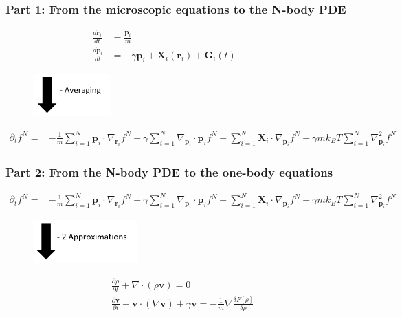 \documentclass[aspectratio=169,xcolor=dvipsnames]{beamer}
\begin{document}
\begin{frame}
	\frametitle{Part 1: From the microscopic equations to the N-body PDE}
	
	\begin{align*}
	\frac{d \mathbf{r}_i}{dt} &= \frac{\mathbf{p}_i}{m}\\
	\frac{d \mathbf{p}_i}{dt} &= - \gamma \mathbf{p}_i + \mathbf{X}_i(\mathbf{r}_i) + \mathbf{G}_i(t) \qquad \quad
	\end{align*}
	\vspace{-0.5cm}
	\begin{figure}
		\includegraphics[width=3cm]{Arrow2.png}
	\end{figure}
	\vspace{-0.3cm}
	\begin{align*}
	\partial_t f^N = &- \frac{1}{m} \sum_{i=1}^N \mathbf{p}_i \cdot \nabla_{\mathbf{r}_i} f^N + \gamma \sum_{i = 1}^N \nabla_{\mathbf{p}_i}
	\cdot \mathbf{p}_i f^N - \sum_{i=1}^N \mathbf{X}_i \cdot \nabla_{\mathbf{p}_i}f^N + \gamma m k_BT \sum_{i=1}^N \nabla^2_{\mathbf{p}_i}f^N	
	\end{align*}

\end{frame}
\begin{frame}
	\frametitle{Part 2: From the N-body PDE to the one-body equations}
	\begin{align*}
	\partial_t f^N = &- \frac{1}{m} \sum_{i=1}^N \mathbf{p}_i \cdot \nabla_{\mathbf{r}_i} f^N + \gamma \sum_{i = 1}^N \nabla_{\mathbf{p}_i}
	\cdot \mathbf{p}_i f^N - \sum_{i=1}^N \mathbf{X}_i \cdot \nabla_{\mathbf{p}_i}f^N + \gamma m k_BT \sum_{i=1}^N \nabla^2_{\mathbf{p}_i}f^N	
	\end{align*}
	\vspace{-0.2cm}
	\begin{figure}
		\includegraphics[width=4cm]{Arrow3.png}
	\end{figure}
	\vspace{-0.3cm}
	\begin{align*}
	&\frac{\partial \rho}{\partial t} + \nabla \cdot \left(\rho \mathbf{v}\right) = 0 \\
	&\frac{\partial \mathbf{v}}{\partial t} + \mathbf{v} \cdot \left(\nabla \mathbf{v}\right) + \gamma \mathbf{v} = - \frac{1}{m} \nabla \frac{\delta {F}[\rho]}{\delta \rho}
	\end{align*}
\end{frame}
\end{document}
